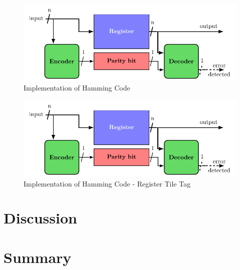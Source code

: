 \begin{figure}[ht]
    \centering
    \includegraphics[page=2, width=\textwidth]{c5_countermeasures_dift/img/archi_contremesures.pdf}
    \caption{Implementation of Hamming Code}
    \label{fig:implementation_hc_1}
\end{figure}

\begin{figure}[ht]
    \centering
    \includegraphics[page=3, width=\textwidth]{c5_countermeasures_dift/img/archi_contremesures.pdf}
    \caption{Implementation of Hamming Code - Register Tile Tag}
    \label{fig:implementation_hc_2}
\end{figure}

\section{Discussion}

\section{Summary}

